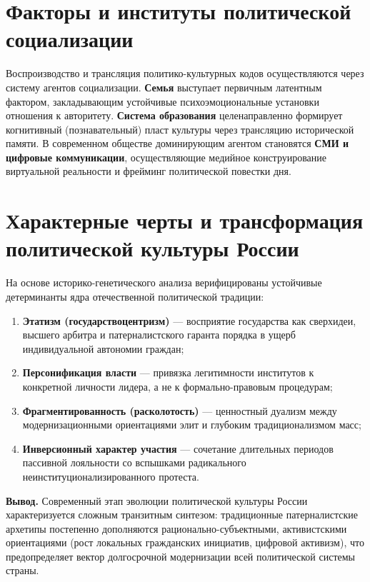 \documentclass[14pt,a4paper]{extarticle}
\begin{document}
\section{Факторы и институты политической социализации}
Воспроизводство и трансляция политико-культурных кодов осуществляются через систему агентов социализации. \textbf{Семья} выступает первичным латентным фактором, закладывающим устойчивые психоэмоциональные установки отношения к авторитету. \textbf{Система образования} целенаправленно формирует когнитивный (познавательный) пласт культуры через трансляцию исторической памяти. В современном обществе доминирующим агентом становятся \textbf{СМИ и цифровые коммуникации}, осуществляющие медийное конструирование виртуальной реальности и фрейминг политической повестки дня.

\section{Характерные черты и трансформация политической культуры России}
На основе историко-генетического анализа верифицированы устойчивые детерминанты ядра отечественной политической традиции:
\begin{enumerate}
    \item \textbf{Этатизм (государствоцентризм)} --- восприятие государства как сверхидеи, высшего арбитра и патерналистского гаранта порядка в ущерб индивидуальной автономии граждан;
    \item \textbf{Персонификация власти} --- привязка легитимности институтов к конкретной личности лидера, а не к формально-правовым процедурам;
    \item \textbf{Фрагментированность (расколотость)} --- ценностный дуализм между модернизационными ориентациями элит и глубоким традиционализмом масс;
    \item \textbf{Инверсионный характер участия} --- сочетание длительных периодов пассивной лояльности со вспышками радикального неинституционализированного протеста.
\end{enumerate}
\textbf{Вывод.} Современный этап эволюции политической культуры России характеризуется сложным транзитным синтезом: традиционные патерналистские архетипы постепенно дополняются рационально-субъектными, активистскими ориентациями (рост локальных гражданских инициатив, цифровой активизм), что предопределяет вектор долгосрочной модернизации всей политической системы страны.
\end{document}
